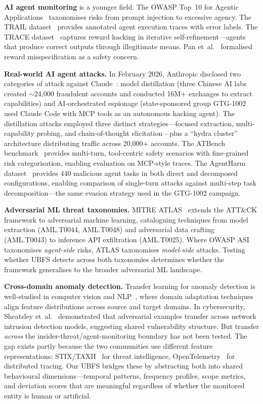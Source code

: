 \documentclass[conference]{IEEEtran}
\begin{document}
\textbf{AI agent monitoring} is a younger field. The OWASP Top~10 for Agentic Applications~\cite{owasp2024asi} taxonomises risks from prompt injection to excessive agency. The TRAIL dataset~\cite{patronus2024trail} provides annotated agent execution traces with error labels. The TRACE dataset~\cite{pan2024trace} captures reward hacking in iterative self-refinement---agents that produce correct outputs through illegitimate means. Pan et~al.~\cite{pan2022effects} formalised reward misspecification as a safety concern.

\textbf{Real-world AI agent attacks.} In February 2026, Anthropic disclosed two categories of attack against Claude~\cite{anthropic2026distillation}: model distillation (three Chinese AI labs created ${\sim}$24,000 fraudulent accounts and conducted 16M+ exchanges to extract capabilities) and AI-orchestrated espionage (state-sponsored group GTG-1002 used Claude Code with MCP tools as an autonomous hacking agent). The distillation attacks employed three distinct strategies---focused extraction, multi-capability probing, and chain-of-thought elicitation---plus a ``hydra cluster'' architecture distributing traffic across 20,000+ accounts. The ATBench benchmark~\cite{atbench2026} provides multi-turn, tool-centric safety scenarios with fine-grained risk categorisation, enabling evaluation on MCP-style traces. The AgentHarm dataset~\cite{andriushchenko2024agentharm} provides 440 malicious agent tasks in both direct and decomposed configurations, enabling comparison of single-turn attacks against multi-step task decomposition---the same evasion strategy used in the GTG-1002 campaign.

\textbf{Adversarial ML threat taxonomies.} MITRE ATLAS~\cite{mitre2024atlas} extends the ATT\&CK framework to adversarial machine learning, cataloguing techniques from model extraction (AML.T0044, AML.T0048) and adversarial data crafting (AML.T0043) to inference API exfiltration (AML.T0025). Where OWASP ASI taxonomises \textit{agent-side} risks, ATLAS taxonomises \textit{model-side} attacks. Testing whether UBFS detects across both taxonomies determines whether the framework generalises to the broader adversarial ML landscape.

\textbf{Cross-domain anomaly detection.} Transfer learning for anomaly detection is well-studied in computer vision and NLP~\cite{zhuang2020transfer}, where domain adaptation techniques align feature distributions across source and target domains. In cybersecurity, Sheatsley et~al.~\cite{sheatsley2022adversarial} demonstrated that adversarial examples transfer across network intrusion detection models, suggesting shared vulnerability structure. But transfer \textit{across} the insider-threat/agent-monitoring boundary has not been tested. The gap exists partly because the two communities use different feature representations: STIX/TAXII~\cite{stix2021} for threat intelligence, OpenTelemetry~\cite{opentelemetry2023} for distributed tracing. Our UBFS bridges these by abstracting both into shared behavioural dimensions---temporal patterns, frequency profiles, scope metrics, and deviation scores that are meaningful regardless of whether the monitored entity is human or artificial.
\end{document}
